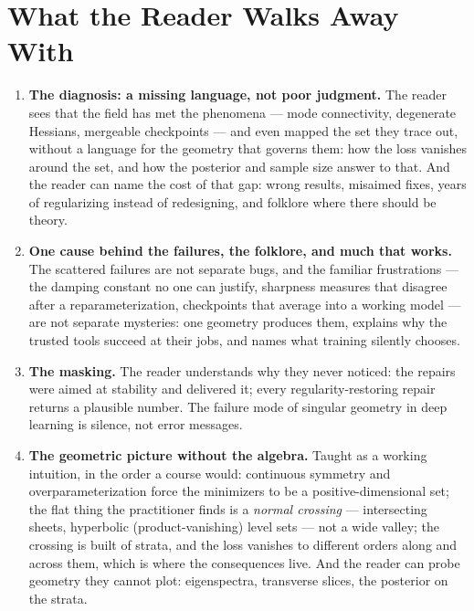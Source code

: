 \documentclass[11pt]{article}
\begin{document}
\section{What the Reader Walks Away With}

\begin{enumerate}[label=\textbf{\arabic*.}, leftmargin=*, itemsep=6pt]

\item \textbf{The diagnosis: a missing language, not poor judgment.}
The reader sees that the field has met the phenomena --- mode
connectivity, degenerate Hessians, mergeable checkpoints --- and even
mapped the set they trace out, without a language for the geometry that
governs them: how the loss vanishes around the set, and how the
posterior and sample size answer to that. And the reader can name the
cost of that gap: wrong results, misaimed fixes, years of regularizing
instead of redesigning, and folklore where there should be theory.

\item \textbf{One cause behind the failures, the folklore, and much
that works.}
The scattered failures are not separate bugs, and the familiar
frustrations --- the damping constant no one can justify, sharpness
measures that disagree after a reparameterization, checkpoints that
average into a working model --- are not separate mysteries: one
geometry produces them, explains why the trusted tools succeed at their
jobs, and names what training silently chooses.

\item \textbf{The masking.}
The reader understands why they never noticed: the repairs were aimed
at stability and delivered it; every regularity-restoring repair
returns a plausible number. The failure mode of singular geometry in
deep learning is silence, not error messages.

\item \textbf{The geometric picture without the algebra.}
Taught as a working intuition, in the order a course would: continuous
symmetry and overparameterization force the minimizers to be a
positive-dimensional set; the flat thing the practitioner finds is a
\emph{normal crossing} --- intersecting sheets, hyperbolic
(product-vanishing) level sets --- not a wide valley; the crossing is
built of strata, and the loss vanishes to different orders along and
across them, which is where the consequences live. And the reader can
probe geometry they cannot plot: eigenspectra, transverse slices, the
posterior on the strata.


\end{enumerate}
\end{document}
